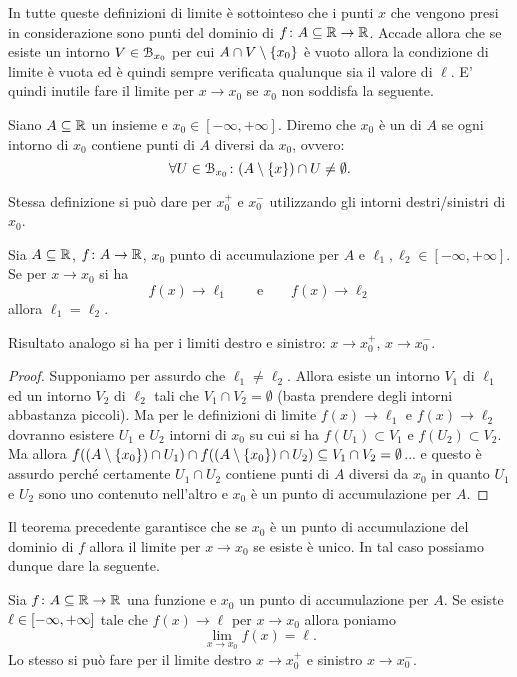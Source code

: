 In tutte queste definizioni di limite è sottointeso che i punti 
$x$ che vengono presi in considerazione sono punti 
del dominio di $f\colon A \subseteq \mathbb R \to \mathbb R$.
Accade allora che se esiste un intorno $V\in \mathcal B_{x_0}$
per cui $A \cap V \setminus {\left\{ x_0 \right\}}$ è vuoto allora 
la condizione di limite è vuota ed è quindi sempre verificata 
qualunque sia il valore di $\ell$. 
E' quindi inutile fare il limite per $x\to x_0$ 
se $x_0$ non soddisfa la seguente.

\begin{definition}
  \mymark{*}
  Siano $A\subseteq  \mathbb R$ un insieme e $x_0\in [-\infty, +\infty]$.
  Diremo che $x_0$ è un  di $A$
  se ogni intorno di $x_0$ contiene punti di $A$ diversi da $x_0$, ovvero:
  \[
   \forall U \in \mathcal B_{x_0}\colon (A\setminus {\left\{ x \right\}}) \cap U \neq \emptyset.
  \]

  Stessa definizione si può dare per $x_0^+$ e $x_0^-$ 
  utilizzando gli intorni destri/sinistri di $x_0$. 
\end{definition}

\begin{theorem}
\mymark{*}
Sia $A\subseteq \mathbb R$, $f\colon A \to \mathbb R$, $x_0$
punto di accumulazione per $A$ e $\ell_1, \ell_2\in [-\infty,+\infty]$.
Se per $x\to x_0$ si ha
\[
  f(x) \to \ell_1 \qquad\text{e}\qquad f(x) \to \ell_2
\]
allora $\ell_1=\ell_2$.

Risultato analogo si ha per i limiti destro e sinistro: $x\to x_0^+$, 
$x\to x_0^-$.
\end{theorem}
%
\begin{proof}
\mymark{*}
Supponiamo per assurdo che $\ell_1\neq \ell_2$.
Allora esiste un intorno $V_1$ di $\ell_1$ ed un intorno $V_2$ di $\ell_2$
tali che $V_1\cap V_2 = \emptyset$ (basta prendere degli intorni abbastanza piccoli). 
Ma per le definizioni di limite $f(x)\to \ell_1$ e $f(x)\to \ell_2$ 
dovranno esistere $U_1$ e $U_2$ intorni di $x_0$ su cui si ha 
$f(U_1)\subset V_1$ e $f(U_2)\subset V_2$. 
Ma allora $f((A\setminus{\left\{ x_0 \right\}})\cap U_1)\cap f((A\setminus{\left\{ x_0 \right\}})\cap U_2)\subseteq V_1\cap V_2 = \emptyset$... 
e questo è assurdo perché certamente $U_1\cap U_2$ 
contiene punti di $A$ diversi da $x_0$ in quanto 
$U_1$ e $U_2$ sono uno contenuto nell'altro e $x_0$ 
è un punto di accumulazione per $A$.
\end{proof}

Il teorema precedente garantisce che se $x_0$ è un punto di accumulazione 
del dominio di $f$ allora il limite per $x\to x_0$ se esiste è unico. 
In tal caso possiamo dunque dare la seguente.
%
\begin{definition}
Sia $f\colon A\subseteq \mathbb R \to \mathbb R$ una funzione e $x_0$ 
un punto di accumulazione per $A$. 
Se esiste $\ell\in\left[-\infty,+\infty\right]$ tale che
$f(x)\to \ell$ per $x\to x_0$ allora poniamo
\[
  \lim_{x\to x_0} f(x) = \ell.
\]
Lo stesso si può fare per il limite destro $x\to x_0^+$ 
e sinistro $x\to x_0^-$.
\end{definition}

